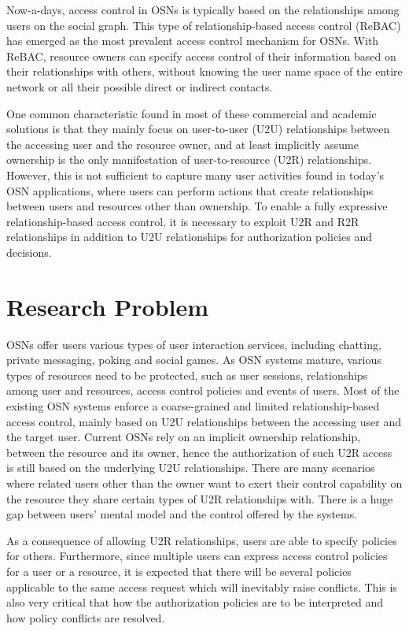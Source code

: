 \documentclass[10pt, conference, compsocconf]{IEEEtran}
\begin{document}
Now-a-days, access control in OSNs is typically based on the relationships among users on the
social graph. This type of relationship-based access control (ReBAC) has emerged as the
most prevalent access control mechanism for OSNs. With ReBAC, resource owners can specify
access control of their information based on their relationships with others, without knowing the
user name space of the entire network or all their possible direct or indirect contacts.

One common characteristic found in most of these commercial and academic solutions is that
they mainly focus on user-to-user (U2U) relationships between the accessing user and the resource
owner, and at least implicitly assume ownership is the only manifestation of user-to-resource (U2R)
relationships. However, this is not sufficient to capture many user activities found in today’s OSN
applications, where users can perform actions that create relationships between users and resources
other than ownership. To enable a fully expressive
relationship-based access control, it is necessary to exploit U2R and R2R relationships in addition
to U2U relationships for authorization policies and decisions.

\section{Research Problem}
OSNs offer users various types of user interaction services, including chatting, private messaging, poking and social games. As OSN systems mature, various types of resources need to be protected, such as user sessions, relationships among user and resources, access control policies and events of users. Most of the existing OSN systems enforce a coarse-grained and limited relationship-based access control, mainly based on U2U relationships between the accessing user and the target user. Current OSNs rely on an implicit ownership relationship, between the resource and its owner, hence the authorization of such U2R access is still based on the underlying U2U relationships. There are many scenarios where related users other than the owner want to exert their control capability on the resource they share certain types of U2R relationships with. There is a huge gap between users’ mental model and the control offered by the systems.

As a consequence of allowing U2R relationships, users are able to specify policies for others.
Furthermore, since multiple users can express access control policies for a user or a resource, it
is expected that there will be several policies applicable to the same access request which will
inevitably raise conflicts. This is also very critical that how the authorization policies
are to be interpreted and how policy conflicts are resolved.
\end{document}
